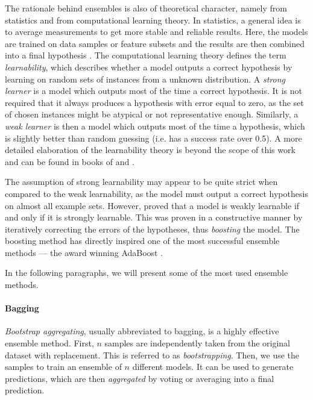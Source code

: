 The rationale behind ensembles is also of theoretical character, namely from
statistics and from computational learning theory. In statistics, a general
idea is to average measurements to get more stable and reliable results.
Here, the models are trained on data samples or feature subsets and the results
are then combined into a final hypothesis \citep[p.~330]{Flach:2012:MLA:2490546}.
The computational learning theory defines the term \emph{learnability},
which describes whether a model outputs a correct hypothesis by learning on
random sets of instances from a unknown distribution. A \emph{strong learner}
is a model which outputs most of the time a correct hypothesis. It is not
required that it always produces a hypothesis with error equal to zero, as 
the set of chosen instances might be atypical or not representative enough.
Similarly, a \emph{weak learner} is then a model which outputs most of the time
a hypothesis, which is slightly better than random guessing (i.e. has a
success rate over 0.5). A more detailed elaboration of the learnability
theory is beyond the scope of this work and can be found in books 
of \citep{Flach:2012:MLA:2490546} and \citep{Mitchell:1997:ML:541177}.

The assumption of strong learnability may appear to be quite strict when 
compared to the weak learnability, as the model must output a correct 
hypothesis on almost all example sets. However,
\cite{Schapire:1990:SWL:83637.83645} proved that a model 
is weakly learnable if and only if it is strongly learnable. 
 This was proven in a constructive manner
by iteratively correcting the errors of the hypotheses, thus \emph{boosting} 
the model. The boosting method has directly inspired one of the most successful
ensemble methods --- the award winning AdaBoost
\citep{Freund:1996:ENB:3091696.3091715, Freund:1997:DGO:261540.261549}.

In the following paragraphs, we will present some of the most used ensemble 
methods.
\paragraph{Bagging} \label{bagging}
\emph{Bootstrap aggregating}, usually abbreviated to bagging, is a highly
effective ensemble method. First, $n$ samples are independently taken from 
the original dataset with replacement. This is referred to as 
\emph{bootstrapping}. Then, we use the samples to train an ensemble of $n$
different models. It can be used to generate predictions, which are
then \emph{aggregated} by voting or averaging into a final prediction.

